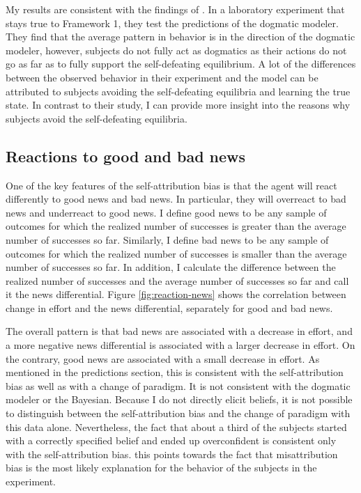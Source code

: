 \documentclass[
  12pt,
]{article}
\begin{document}
My results are consistent with the findings of \citet{Hestermann2021}.
In a laboratory experiment that stays true to Framework 1, they test the
predictions of the dogmatic modeler. They find that the average pattern
in behavior is in the direction of the dogmatic modeler, however,
subjects do not fully act as dogmatics as their actions do not go as far
as to fully support the self-defeating equilibrium. A lot of the
differences between the observed behavior in their experiment and the
model can be attributed to subjects avoiding the self-defeating
equilibria and learning the true state. In contrast to their study, I
can provide more insight into the reasons why subjects avoid the
self-defeating equilibria.

\hypertarget{reactions-to-good-and-bad-news}{%
\subsection{Reactions to good and bad
news}\label{reactions-to-good-and-bad-news}}

One of the key features of the self-attribution bias is that the agent
will react differently to good news and bad news. In particular, they
will overreact to bad news and underreact to good news. I define good
news to be any sample of outcomes for which the realized number of
successes is greater than the average number of successes so far.
Similarly, I define bad news to be any sample of outcomes for which the
realized number of successes is smaller than the average number of
successes so far. In addition, I calculate the difference between the
realized number of successes and the average number of successes so far
and call it the news differential. Figure \ref{fig:reaction-news} shows
the correlation between change in effort and the news differential,
separately for good and bad news.

The overall pattern is that bad news are associated with a decrease in
effort, and a more negative news differential is associated with a
larger decrease in effort. On the contrary, good news are associated
with a small decrease in effort. As mentioned in the predictions
section, this is consistent with the self-attribution bias as well as
with a change of paradigm. It is not consistent with the dogmatic
modeler or the Bayesian. Because I do not directly elicit beliefs, it is
not possible to distinguish between the self-attribution bias and the
change of paradigm with this data alone. Nevertheless, the fact that
about a third of the subjects started with a correctly specified belief
and ended up overconfident is consistent only with the self-attribution
bias. this points towards the fact that misattribution bias is the most
likely explanation for the behavior of the subjects in the experiment.
\end{document}

